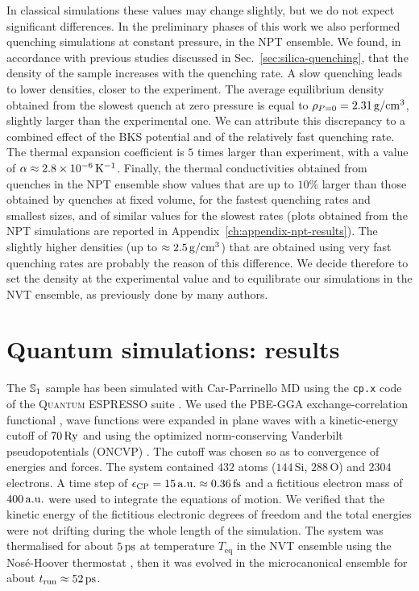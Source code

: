 In classical simulations these values may change slightly, but we do not expect significant differences. 
In the preliminary phases of this work we also performed quenching simulations at constant pressure, in the NPT ensemble. 
We found, in accordance with previous studies discussed in Sec.~\ref{sec:silica-quenching}, that the density of the sample increases with the quenching rate. A slow quenching leads to lower densities, closer to the experiment. The average equilibrium density obtained from the slowest quench at zero pressure is equal to $\rho_{P=0}=2.31\,\mathrm{g/cm^3}$, slightly larger than the experimental one. We can attribute this discrepancy to a combined effect of the BKS potential and of the relatively fast quenching rate. 
The thermal expansion coefficient is $5$ times larger than experiment, with a value of $\alpha\approx 2.8\times 10^{-6} \,\mathrm{K^{-1}}$. 
Finally, the thermal conductivities obtained from quenches in the NPT ensemble show values that are up to $10\%$ larger than those obtained by quenches at fixed volume, for the fastest quenching rates and smallest sizes, and of similar values for the slowest rates (plots obtained from the NPT simulations are reported in Appendix~\ref{ch:appendix-npt-results}). 
The slightly higher densities (up to $\approx 2.5\,\mathrm{g/cm^3}$) that are obtained using very fast quenching rates are probably the reason of this difference. 
We decide therefore to set the density at the experimental value and to equilibrate our simulations in the NVT ensemble, as previously done by many authors.




\section{Quantum simulations: results}  \label{sec:results-quantum}
The $\S1$ sample has been simulated with Car-Parrinello MD using the \texttt{cp.x} code of the \textsc{Quantum ESPRESSO} suite \cite{Giannozzi2009,Giannozzi2017}. 
We used the PBE-GGA exchange-correlation functional \cite{Perdew1996}, wave functions were expanded in plane waves with a kinetic-energy cutoff of $70\,\mathrm{Ry}$ and using the optimized norm-conserving Vanderbilt pseudopotentials (ONCVP) \cite{Schlipf2015,Hamann2013}. The cutoff was chosen so as to convergence of energies and forces. 
The system contained $432$ atoms ($144\,$Si, $288\,$O) and $2304$ electrons. A time step of $\epsilon_\textrm{CP} = 15\,\mathrm{a.u.} \approx 0.36\,\mathrm{fs}$ and a fictitious electron mass of $400\,\mathrm{a.u.}$ were used to integrate the equations of motion. 
We verified that the kinetic energy of the fictitious electronic degrees of freedom and the total energies were not drifting during the whole length of the simulation. 
The system was thermalised for about $5\,\mathrm{ps}$ at temperature $T_\mathrm{eq}$ in the NVT ensemble using the Nos\'e-Hoover thermostat \cite{Nose1984,Hoover1985}, then it was evolved in the microcanonical ensemble for about $t_\mathrm{run}\approx 52\,\mathrm{ps}$. 

